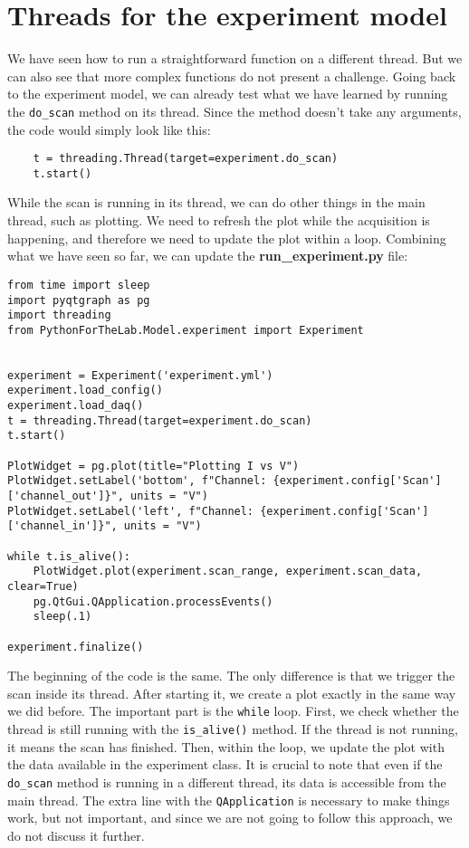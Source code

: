 \section{Threads for the experiment model}\label{sec:threads-experiment-model}
We have seen how to run a straightforward function on a different thread. But we can also see that more complex functions do not present a challenge. Going back to the experiment model, we can already test what we have learned by running the \texttt{do\_scan} method on its thread. Since the method doesn't take any arguments, the code would simply look like this:

\begin{verbatim}
    t = threading.Thread(target=experiment.do_scan)
    t.start()
\end{verbatim}

While the scan is running in its thread, we can do other things in the main thread, such as plotting. We need to refresh the plot while the acquisition is happening, and therefore we need to update the plot within a loop. Combining what we have seen so far, we can update the \textbf{run\_experiment.py} file:

\begin{verbatim}
from time import sleep
import pyqtgraph as pg
import threading
from PythonForTheLab.Model.experiment import Experiment


experiment = Experiment('experiment.yml')
experiment.load_config()
experiment.load_daq()
t = threading.Thread(target=experiment.do_scan)
t.start()

PlotWidget = pg.plot(title="Plotting I vs V")
PlotWidget.setLabel('bottom', f"Channel: {experiment.config['Scan']['channel_out']}", units = "V")
PlotWidget.setLabel('left', f"Channel: {experiment.config['Scan']['channel_in']}", units = "V")

while t.is_alive():
    PlotWidget.plot(experiment.scan_range, experiment.scan_data, clear=True)
    pg.QtGui.QApplication.processEvents()
    sleep(.1)

experiment.finalize()
\end{verbatim}

The beginning of the code is the same. The only difference is that we trigger the scan inside its thread. After starting it, we create a plot exactly in the same way we did before. The important part is the \texttt{while} loop. First, we check whether the thread is still running with the \texttt{is_alive()} method. If the thread is not running, it means the scan has finished. Then, within the loop, we update the plot with the data available in the experiment class. It is crucial to note that even if the \texttt{do\_scan} method is running in a different thread, its data is accessible from the main thread. The extra line with the \texttt{QApplication} is necessary to make things work, but not important, and since we are not going to follow this approach, we do not discuss it further.


